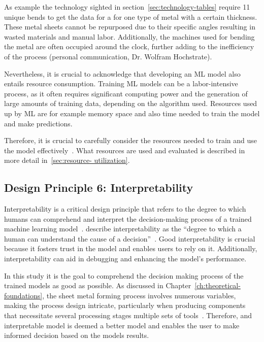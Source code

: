 As example the technology sighted in section~\ref{sec:technology-tables} require 11 unique bends to get the data
for a for one type of metal with a certain thickness.
These metal sheets cannot be repurposed due to their specific angles resulting in wasted materials and manual labor.
Additionally, the machines used for bending the metal are often occupied around the clock, further adding to the
inefficiency of the process (personal communication, Dr. Wolfram Hochstrate).

Nevertheless, it is crucial to acknowledge that developing an \ac{ML} model also entails resource
consumption.
Training \ac{ML} models can be a labor-intensive process, as it often requires significant
computing power and the generation of large amounts of training data, depending on the algorithm
used.
Resources used up by \ac{ML} are for example memory space and also time needed to train the model and make predictions.

Therefore, it is crucial to carefully consider the resources needed to train and use the model
effectively~\cite[p. 16]{siebert2022construction}.
What resources are used and evaluated is described in more detail in~\ref{sec:resource- utilization}.

\subsection*{Design Principle 6: Interpretability}
Interpretability is a critical design principle that refers to the degree to which humans can comprehend and
interpret the decision-making process of a trained machine learning model~\cite[p. 13]{molnar2020interpretable}.
\cite{miller2019explanation} describe interpretability as the ``degree to which a human can understand the cause
of a decision''~\cite[p. 1]{miller2019explanation}.
Good interpretability is crucial because it fosters trust in the model and enables users to rely on it.
Additionally, interpretability can aid in debugging and enhancing the model's performance.

In this study it is the goal to comprehend the decision making process of the trained models as good as possible.
As discussed in Chapter~\ref{ch:theoretical-foundations}, the sheet metal forming process involves numerous
variables, making the process design intricate, particularly when producing components that necessitate several
processing stages multiple sets of tools~\cite[p. 1]{dib_singleensembleclassifiers_2020}.
Therefore,  and interpretable model is deemed a better model and enables the user to make informed decision based
on the models results.


